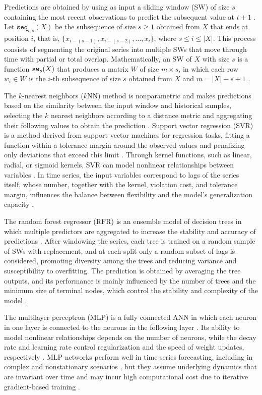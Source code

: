 \documentclass[final,3p,times,twocolumn,authoryear]{elsarticle}
\begin{document}
Predictions are obtained by using as input a sliding window (SW) of size $s$ containing the most recent observations to predict the subsequent value at $t+1$ \citep{han_data_2012}. Let $\texttt{seq}_{i,s}(X)$ be the subsequence of size $s \geq 1$ obtained from $X$ that ends at position $i$, that is, $\{x_{i-(s-1)}, x_{i-(s-2)}, \dots, x_i\}$, where $s \leq i \leq |X|$. This process consists of segmenting the original series into multiple SWs that move through time with partial or total overlap. Mathematically, an SW of $X$ with size $s$ is a function $\text{\texttt{sw}}_s(X)$ that produces a matrix $W$ of size $m \times s$, in which each row $w_i \in W$ is the $i$-th subsequence of size $s$ obtained from $X$ and $m = |X| - s + 1$ \citep{ogasawara_event_2025}.

The $k$-nearest neighbors ($k$NN) method is nonparametric and makes predictions based on the similarity between the input window and historical samples, selecting the $k$ nearest neighbors according to a distance metric and aggregating their following values to obtain the prediction \citep{yakowitz_nearest_1987}. Support vector regression (SVR) is a method derived from support vector machines for regression tasks, fitting a function within a tolerance margin around the observed values and penalizing only deviations that exceed this limit \citep{vapnik_support_1996}. Through kernel functions, such as linear, radial, or sigmoid kernels, SVR can model nonlinear relationships between variables \citep{haykin_neural_2009}. In time series, the input variables correspond to lags of the series itself, whose number, together with the kernel, violation cost, and tolerance margin, influences the balance between flexibility and the model's generalization capacity \citep{cao_support_2003}.

The random forest regressor (RFR) is an ensemble model of decision trees in which multiple predictors are aggregated to increase the stability and accuracy of predictions \citep{breiman_random_2001}. After windowing the series, each tree is trained on a random sample of SWs with replacement, and at each split only a random subset of lags is considered, promoting diversity among the trees and reducing variance and susceptibility to overfitting. The prediction is obtained by averaging the tree outputs, and its performance is mainly influenced by the number of trees and the minimum size of terminal nodes, which control the stability and complexity of the model \citep{breiman_random_2001}.

The multilayer perceptron (MLP) is a fully connected ANN in which each neuron in one layer is connected to the neurons in the following layer \citep{bishop_neural_1995}. Its ability to model nonlinear relationships depends on the number of neurons, while the decay rate and learning rate control regularization and the speed of weight updates, respectively \citep{haykin_neural_2009}. MLP networks perform well in time series forecasting, including in complex and nonstationary scenarios \citep{aslanargun_comparison_2007, weytjens_cash_2019}, but they assume underlying dynamics that are invariant over time and may incur high computational cost due to iterative gradient-based training \citep{huang_extreme_2006, makridakis_statistical_2018}.
\end{document}
